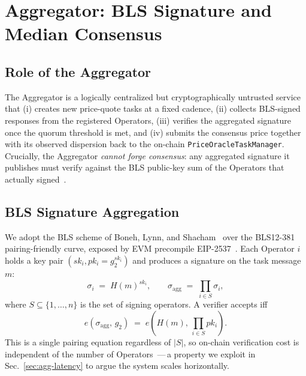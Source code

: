 \section{Aggregator: BLS Signature and Median Consensus}
\label{sec:aggregator}


\subsection{Role of the Aggregator}
\label{sec:agg-role}

The Aggregator is a logically centralized but cryptographically
untrusted service that (i) creates new price-quote tasks at a fixed
cadence, (ii) collects BLS-signed responses from the registered
Operators, (iii) verifies the aggregated signature once the quorum
threshold is met, and (iv) submits the consensus price together with
its observed dispersion back to the on-chain
\texttt{PriceOracleTaskManager}.  Crucially, the Aggregator
\emph{cannot forge consensus}: any aggregated signature it publishes
must verify against the BLS public-key sum of the Operators that
actually signed~\cite{eigenlayer2023, eigenlabs_avsbook}.

\subsection{BLS Signature Aggregation}
\label{sec:agg-bls}

We adopt the BLS scheme of Boneh, Lynn, and Shacham~\cite{boneh2004short}
over the BLS12-381 pairing-friendly curve, exposed by EVM precompile
EIP-2537~\cite{eip2537}.  Each Operator $i$ holds a key pair
$(\mathit{sk}_i, pk_i = g_2^{\mathit{sk}_i})$ and produces a signature
on the task message $m$:
\begin{equation}
\sigma_i \;=\; H(m)^{\mathit{sk}_i}, \qquad
\sigma_{\mathrm{agg}} \;=\; \prod_{i \in S} \sigma_i,
\label{eq:bls-agg}
\end{equation}
where $S \subseteq \{1, \dots, n\}$ is the set of signing operators.
A verifier accepts iff
\begin{equation}
e\!\left(\sigma_{\mathrm{agg}},\, g_2\right)
\;=\;
e\!\left(H(m),\, \prod_{i \in S} pk_i\right).
\label{eq:bls-verify}
\end{equation}
This is a single pairing equation regardless of $|S|$, so on-chain
verification cost is independent of the number of Operators
\cite{boneh2018compact}\,---\,a property we exploit in
Sec.~\ref{sec:agg-latency} to argue the system scales horizontally.

